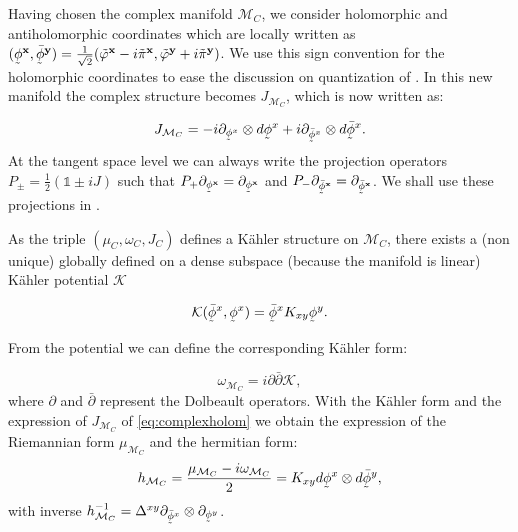 \documentclass{elsarticle}%
\newcommand{\utilde}[1]{\underaccent{\tilde}{#1}}
\begin{document}
 Having chosen the complex manifold $\mathcal{M}_C$, we consider holomorphic and antiholomorphic  coordinates which are locally written as $(\utilde\phi^{\mathbf{x}},\utilde{\bar\phi}^{\mathbf{y}})=\frac{1}{\sqrt{2}}(\tilde{\varphi}^{\mathbf{x}}-i\tilde{\pi}^{\mathbf{x}},\tilde{\varphi}^{\mathbf{y}}+i\tilde{\pi}^{\mathbf{y}})$. We use this sign convention for the holomorphic coordinates to ease the discussion on quantization of \cite{alonsoGeometricFlavours2024}.  In this new manifold the complex structure becomes  $J_{\mathcal{M}_C}$, which  is now written as: 

\begin{equation}
\label{eq:complexholom}
J_{\mathcal{M}_C}=-i \partial_{\utilde\phi^x}\otimes d\utilde\phi^x+i \partial_{\utilde{\bar{\phi}}^x}\otimes d\utilde{\bar{\phi}}^x.
\end{equation}
At the tangent space level we can always write the projection operators $P_{\pm}=\frac12(\mathds{1}\pm iJ)$ such that $P_{+}\partial_{\utilde\phi^{\mathbf{x}}}=\partial_{\utilde\phi^{\mathbf{x}}}$ and $P_{-}\partial_{\utilde{\bar\phi}^{\mathbf{x}}}=\partial_{\utilde{\bar\phi}^{\mathbf{x}}}$. We shall use these projections in \cite{alonsoGeometricFlavours2024}.

As the triple $(\mu_C, \omega_C, J_C)$ defines a Kähler structure on $\mathcal{M}_C$, there exists
a (non unique) globally defined on a dense subspace (because the manifold is linear) Kähler potential  $\mathcal{K}$

\begin{equation}
\label{eq:kahlerpotential}
\mathcal{K}(\utilde{\bar \phi}^x, \utilde\phi^x)=\utilde{\bar \phi}^x  K_{xy} \utilde\phi^y .
\end{equation}



From the potential we can define the corresponding  Kähler form:

\begin{equation}
\label{eq:kahlerform}
\omega_{\mathcal{M}_C}= i\partial \bar \partial \mathcal{K},
\end{equation}
where $\partial$ and $\bar \partial$ represent the Dolbeault operators.  With the Kähler form and the expression of $J_{\mathcal{M}_C}$ of \eqref{eq:complexholom} we obtain the expression of the Riemannian form $\mu_{\mathcal{M}_C}$ and the hermitian form: $$h_{\mathcal{M}_C}= \frac{\mu_{\mathcal{M}_C}-i\omega_{\mathcal{M}_C}}{2}= K_{xy}d\utilde{\phi}^x\otimes d\utilde{\bar{\phi}}^y,$$ 
with inverse $h^{-1}_{\mathcal{M}_C}=\Delta^{xy}\partial_{\utilde{\bar\phi}^x}\otimes\partial_{\utilde{\phi}^y}$.
\end{document}
